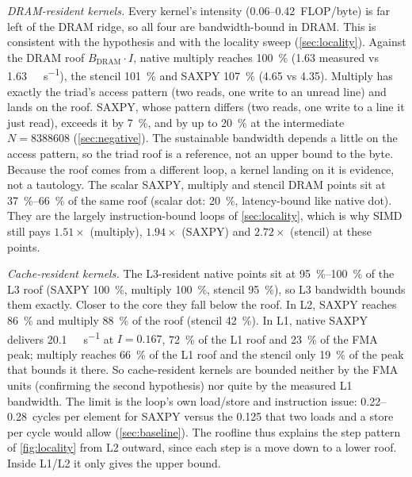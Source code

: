 \emph{DRAM-resident kernels.} Every kernel's intensity (\numrange{0.06}{0.42}~FLOP/byte) is far left
of the DRAM ridge, so all four are bandwidth-bound in DRAM. This is consistent with the hypothesis
and with the locality sweep (\cref{sec:locality}). Against the DRAM roof $B_{\text{DRAM}}\cdot I$,
native multiply reaches \SI{100}{\percent} (\num{1.63} measured vs \qty{1.63}{\giga\flop\per\second}),
the stencil \SI{101}{\percent} and SAXPY \SI{107}{\percent} (\num{4.65} vs \num{4.35}). Multiply has
exactly the triad's access pattern (two reads, one write to an unread line) and lands on the roof.
SAXPY, whose pattern differs (two reads, one write to a line it just read), exceeds it by
\SI{7}{\percent}, and by up to \SI{20}{\percent} at the intermediate $N=\num{8388608}$
(\cref{sec:negative}). The sustainable bandwidth depends a little on the access pattern, so the
triad roof is a reference, not an upper bound to the byte. Because the roof comes from a different
loop, a kernel landing on it is evidence, not a tautology. The scalar SAXPY, multiply and stencil
DRAM points sit at \SIrange{37}{66}{\percent} of the same roof (scalar dot: \SI{20}{\percent},
latency-bound like native dot). They are the largely instruction-bound loops of
\cref{sec:locality}, which is why SIMD still pays $1.51\times$
(multiply), $1.94\times$ (SAXPY) and $2.72\times$ (stencil) at these points.

\emph{Cache-resident kernels.} The L3-resident native points sit at \SIrange{95}{100}{\percent} of the
L3 roof (SAXPY \SI{100}{\percent}, multiply \SI{100}{\percent}, stencil \SI{95}{\percent}), so L3
bandwidth bounds them exactly. Closer to the core they fall below the roof. In L2, SAXPY reaches
\SI{86}{\percent} and multiply \SI{88}{\percent} of the roof (stencil \SI{42}{\percent}). In L1,
native SAXPY delivers \qty{20.1}{\giga\flop\per\second} at $I=\num{0.167}$, \SI{72}{\percent} of the
L1 roof and \SI{23}{\percent} of the FMA peak; multiply reaches \SI{66}{\percent} of the L1 roof and
the stencil only \SI{19}{\percent} of the peak that bounds it there. So cache-resident kernels are
bounded neither by the FMA units (confirming the second hypothesis) nor quite by the measured L1
bandwidth. The limit is the loop's own load/store and instruction issue:
\numrange{0.22}{0.28}~cycles per element for SAXPY versus the \num{0.125} that two loads and a store
per cycle would allow (\cref{sec:baseline}). The roofline thus explains the step pattern of
\cref{fig:locality} from L2 outward, since each step is a move down to a lower roof. Inside L1/L2 it
only gives the upper bound.

